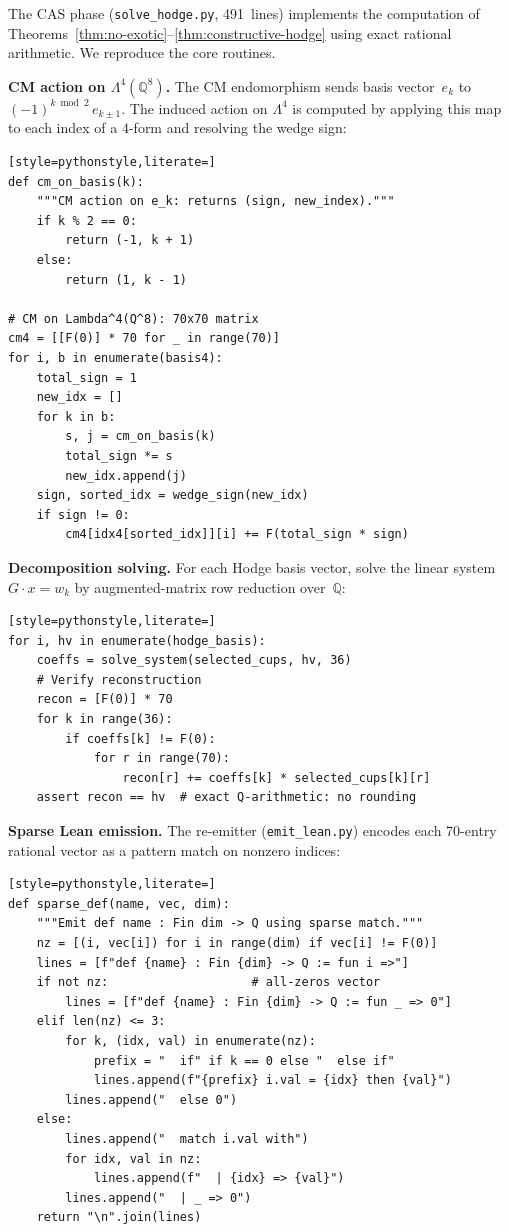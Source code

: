 \documentclass[11pt]{article}
\theoremstyle{plain}
\theoremstyle{definition}
\theoremstyle{remark}
\newcommand{\Q}{\mathbb{Q}}
\begin{document}
The CAS phase (\texttt{solve\_hodge.py}, 491~lines) implements the
computation of Theorems~\ref{thm:no-exotic}--\ref{thm:constructive-hodge}
using exact rational arithmetic.  We reproduce the core routines.

\medskip\noindent
\textbf{CM action on $\Lambda^4(\Q^8)$.}
The CM endomorphism sends basis vector~$e_k$ to
$(-1)^{k\bmod 2}\,e_{k \pm 1}$.  The induced action on
$\Lambda^4$ is computed by applying this map to each index of
a $4$-form and resolving the wedge sign:

\begin{lstlisting}[style=pythonstyle,literate=]
def cm_on_basis(k):
    """CM action on e_k: returns (sign, new_index)."""
    if k % 2 == 0:
        return (-1, k + 1)
    else:
        return (1, k - 1)

# CM on Lambda^4(Q^8): 70x70 matrix
cm4 = [[F(0)] * 70 for _ in range(70)]
for i, b in enumerate(basis4):
    total_sign = 1
    new_idx = []
    for k in b:
        s, j = cm_on_basis(k)
        total_sign *= s
        new_idx.append(j)
    sign, sorted_idx = wedge_sign(new_idx)
    if sign != 0:
        cm4[idx4[sorted_idx]][i] += F(total_sign * sign)
\end{lstlisting}

\medskip\noindent
\textbf{Decomposition solving.}
For each Hodge basis vector, solve the linear system
$G \cdot x = w_k$ by augmented-matrix row reduction over~$\Q$:

\begin{lstlisting}[style=pythonstyle,literate=]
for i, hv in enumerate(hodge_basis):
    coeffs = solve_system(selected_cups, hv, 36)
    # Verify reconstruction
    recon = [F(0)] * 70
    for k in range(36):
        if coeffs[k] != F(0):
            for r in range(70):
                recon[r] += coeffs[k] * selected_cups[k][r]
    assert recon == hv  # exact Q-arithmetic: no rounding
\end{lstlisting}

\medskip\noindent
\textbf{Sparse Lean emission.}
The re-emitter (\texttt{emit\_lean.py}) encodes each
70-entry rational vector as a pattern match on nonzero indices:

\begin{lstlisting}[style=pythonstyle,literate=]
def sparse_def(name, vec, dim):
    """Emit def name : Fin dim -> Q using sparse match."""
    nz = [(i, vec[i]) for i in range(dim) if vec[i] != F(0)]
    lines = [f"def {name} : Fin {dim} -> Q := fun i =>"]
    if not nz:                    # all-zeros vector
        lines = [f"def {name} : Fin {dim} -> Q := fun _ => 0"]
    elif len(nz) <= 3:
        for k, (idx, val) in enumerate(nz):
            prefix = "  if" if k == 0 else "  else if"
            lines.append(f"{prefix} i.val = {idx} then {val}")
        lines.append("  else 0")
    else:
        lines.append("  match i.val with")
        for idx, val in nz:
            lines.append(f"  | {idx} => {val}")
        lines.append("  | _ => 0")
    return "\n".join(lines)
\end{lstlisting}
\end{document}
